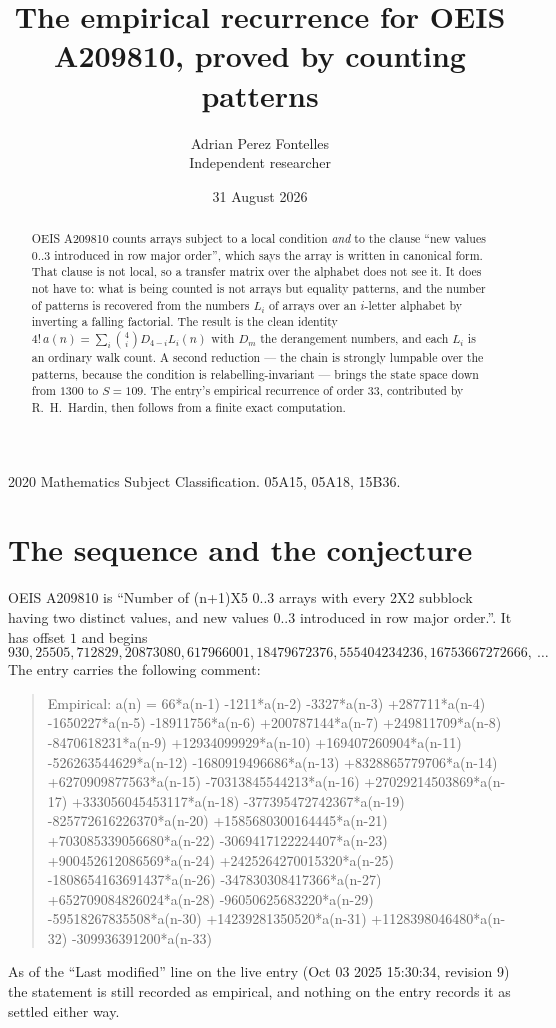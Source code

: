 \documentclass[11pt,a4paper]{article}
\title{The empirical recurrence for OEIS A209810, proved by counting patterns}
\author{Adrian Perez Fontelles\\ \small Independent researcher}
\date{31 August 2026}
\theoremstyle{plain}
\theoremstyle{definition}
\begin{document}
\maketitle

\begin{abstract}
OEIS A209810 counts arrays subject to a local condition \emph{and} to the clause ``new values
$0..3$ introduced in row major order'', which says the array is written in canonical
form. That clause is not local, so a transfer matrix over the alphabet does not see it. It
does not have to: what is being counted is not arrays but equality patterns, and the number
of patterns is recovered from the numbers $L_i$ of arrays over an $i$-letter alphabet by
inverting a falling factorial. The result is the clean identity
$4!\,a(n)=\sum_i\binom{4}{i}D_{4-i}L_i(n)$ with $D_m$ the derangement numbers,
and each $L_i$ is an ordinary walk count. A second reduction --- the chain is strongly
lumpable over the patterns, because the condition is relabelling-invariant --- brings the
state space down from $1300$ to $S=109$. The entry's empirical recurrence of order
$33$, contributed by R.~H.~Hardin, then follows from a finite exact computation.
\end{abstract}

\noindent\small 2020 Mathematics Subject Classification. 05A15, 05A18, 15B36.\normalsize

\section{The sequence and the conjecture}

OEIS A209810 is ``Number of (n+1)X5 0..3 arrays with every 2X2 subblock having two distinct values, and new values 0..3 introduced in row major order.''. It has offset $1$ and begins
\[
930, 25505, 712829, 20873080, 617966001, 18479672376, 555404234236, 16753667272666,\ \dots
\]
The entry carries the following comment:
\begin{quote}\small
Empirical: a(n) = 66*a(n-1) -1211*a(n-2) -3327*a(n-3) +287711*a(n-4) -1650227*a(n-5) -18911756*a(n-6) +200787144*a(n-7) +249811709*a(n-8) -8470618231*a(n-9) +12934099929*a(n-10) +169407260904*a(n-11) -526263544629*a(n-12) -1680919496686*a(n-13) +8328865779706*a(n-14) +6270909877563*a(n-15) -70313845544213*a(n-16) +27029214503869*a(n-17) +333056045453117*a(n-18) -377395472742367*a(n-19) -825772616226370*a(n-20) +1585680300164445*a(n-21) +703085339056680*a(n-22) -3069417122224407*a(n-23) +900452612086569*a(n-24) +2425264270015320*a(n-25) -1808654163691437*a(n-26) -347830308417366*a(n-27) +652709084826024*a(n-28) -96050625683220*a(n-29) -59518267835508*a(n-30) +14239281350520*a(n-31) +1128398046480*a(n-32) -309936391200*a(n-33)
\end{quote}
As of the ``Last modified'' line on the live entry (Oct 03 2025 15:30:34, revision 9) the statement is
still recorded as empirical, and nothing on the entry records it as settled either way.
\end{document}
